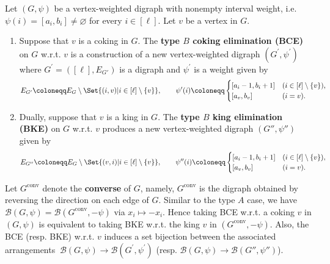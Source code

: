\begin{definition}
\label{def:BCE-BKE}
Let $(G,\psi)$ be a vertex-weighted digraph with nonempty interval weight,  i.e. $ \psi(i) = [a_{i}, b_{i}]\ne \varnothing$ for every $ i \in [\ell] $. Let  $v$ be a vertex in $G$.
\begin{enumerate}[(1)]
\item Suppose that $v$ is a coking in $ G $. 
The \textbf{type $B$ coking elimination (BCE)} on $G$ w.r.t. $v$ is a construction of a new vertex-weighted digraph $ (G^{\prime}, \psi^{\prime}) $ where $ G^{\prime}  =( [\ell] , E_{G'})$ is a digraph   and $ \psi^{\prime} $ is a weight given by
\begin{align*}
E_{G^{\prime}}  \coloneqq E_{G}\setminus\Set{(i,v) | i \in [\ell]\setminus\{v\}}, \qquad
\psi^{\prime}(i)  \coloneqq \begin{cases}
[a_{i}-1, b_{i}+1] & (i \in [\ell]\setminus\{v\}), \\
[a_{v}, b_{v}] & (i=v). 
\end{cases}
\end{align*}
\item Dually, suppose that  $v$ is a king in $ G $. 
The \textbf{type $B$ king elimination (BKE)} on $G$ w.r.t. $v$  produces a new vertex-weighted digraph $ (G'', \psi'') $ given by
\begin{align*}
E_{G''}  \coloneqq E_{G}\setminus\Set{(v,i) | i \in [\ell]\setminus\{v\}}, \qquad
\psi''(i)  \coloneqq \begin{cases}
[a_{i}-1, b_{i}+1] & (i \in [\ell]\setminus\{v\}), \\
[a_{v}, b_{v}] & (i=v). 
\end{cases}
\end{align*}
\end{enumerate}
\end{definition}
Let  $ G^{\mathrm{conv}} $ denote the \textbf{converse} of $G$, namely, $ G^{\mathrm{conv}} $ is the digraph obtained by reversing the direction on each edge of $ G $. 
Similar to the type $A$ case, we have $ \mathcal{B}(G,\psi) =  \mathcal{B}(G^{\mathrm{conv}}, -\psi) $ via $ x_{i} \mapsto -x_i $.
Hence taking BCE w.r.t. a coking $v$ in $(G,\psi)$ is equivalent to  taking BKE w.r.t. the king $v$ in $(G^{\mathrm{conv}}, -\psi)$.
Also, the BCE (resp. BKE) w.r.t. $v$ induces a set bijection between the associated arrangements $\ \mathcal{B}(G,\psi) \longrightarrow  \mathcal{B}(G^{\prime}, \psi^{\prime}) $ (resp. $  \mathcal{B}(G,\psi) \longrightarrow  \mathcal{B}(G'', \psi'') $).



